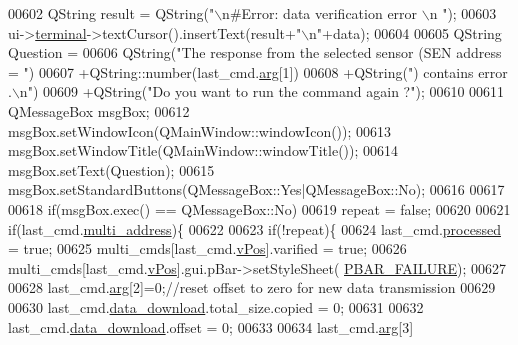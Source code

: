 \begin{DoxyCode}
{{{{{{{{{{{{{{{{{{00602              QString result =  QString(\textcolor{stringliteral}{"\(\backslash\)n#Error: data verification error \(\backslash\)n "});
00603              ui->\hyperlink{a00080_aae71c46ea4546df5994735dee573b2dd}{terminal}->textCursor().insertText(result+\textcolor{stringliteral}{"\(\backslash\)n"}+data);
00604 
00605              QString Question =
00606                      QString(\textcolor{stringliteral}{"The response from the selected sensor (SEN address = "})
00607                      +QString::number(last\_cmd.\hyperlink{a00004_a56e6c2d7315d0ae60a51e8b140c9cfe4}{arg}[1])
00608                      +QString(\textcolor{stringliteral}{") contains error .\(\backslash\)n"})
00609                      +QString(\textcolor{stringliteral}{"Do you want to run the command again ?"});
00610 
00611              QMessageBox msgBox;
00612              msgBox.setWindowIcon(QMainWindow::windowIcon());
00613              msgBox.setWindowTitle(QMainWindow::windowTitle());
00614              msgBox.setText(Question);
00615              msgBox.setStandardButtons(QMessageBox::Yes|QMessageBox::No);
00616 
00617 
00618              \textcolor{keywordflow}{if}(msgBox.exec() == QMessageBox::No)
00619                       repeat = \textcolor{keyword}{false};
00620 
00621                  \textcolor{keywordflow}{if}(last\_cmd.\hyperlink{a00004_a8e69b971c61ced27a7567efd2bf0db59}{multi\_address})\{
00622 
00623                      \textcolor{keywordflow}{if}(!repeat)\{
00624                      last\_cmd.\hyperlink{a00004_a3e88f779da9798a5da7dda227e2ca388}{processed} = \textcolor{keyword}{true};
00625                      multi\_cmds[last\_cmd.\hyperlink{a00004_a2b48b371fd84be2a8ad581b1ad708b88}{vPos}].varified = \textcolor{keyword}{true};
00626                      multi\_cmds[last\_cmd.\hyperlink{a00004_a2b48b371fd84be2a8ad581b1ad708b88}{vPos}].gui.pBar->setStyleSheet(
      \hyperlink{a00090_aa9f43b2774395af6510910f8feed7cb4}{PBAR\_FAILURE});
00627                      
00628                      last\_cmd.\hyperlink{a00004_a56e6c2d7315d0ae60a51e8b140c9cfe4}{arg}[2]=0;\textcolor{comment}{//reset offset to zero for new data transmission}
00629                        
00630                      last\_cmd.\hyperlink{a00004_a5cfeaed4d4f8e51070a324c0ba893ebe}{data\_download}.total\_size.copied       = 0;
00631                      
00632                      last\_cmd.\hyperlink{a00004_a5cfeaed4d4f8e51070a324c0ba893ebe}{data\_download}.offset                  = 0;
00633                      
00634                      last\_cmd.\hyperlink{a00004_a56e6c2d7315d0ae60a51e8b140c9cfe4}{arg}[3]              
}}}}}}}}}}}}}}}}}}
\end{DoxyCode}
